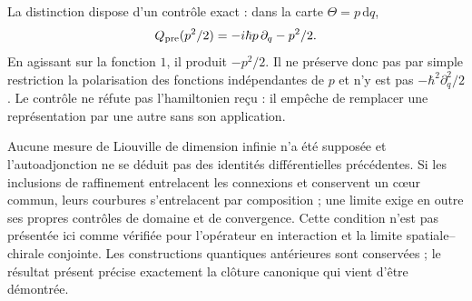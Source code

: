La distinction dispose d’un contrôle exact : dans la carte \(\Theta=p\,\mathrm dq\),
\begin{equation}
 Q_{\rm pre}(p^2/2)=-i\hbar p\,\partial_q-p^2/2.
 \label{hmtcuatro:control-polarizacion}
\end{equation}
En agissant sur la fonction \(1\), il produit \(-p^2/2\). Il ne préserve donc pas par simple restriction la polarisation des fonctions indépendantes de \(p\) et n’y est pas \(-\hbar^2\partial_q^2/2\). Le contrôle ne réfute pas l’hamiltonien reçu : il empêche de remplacer une représentation par une autre sans son application.

Aucune mesure de Liouville de dimension infinie n’a été supposée et l’autoadjonction ne se déduit pas des identités différentielles précédentes. Si les inclusions de raffinement entrelacent les connexions et conservent un cœur commun, leurs courbures s’entrelacent par composition ; une limite exige en outre ses propres contrôles de domaine et de convergence. Cette condition n’est pas présentée ici comme vérifiée pour l’opérateur en interaction et la limite spatiale--chirale conjointe. Les constructions quantiques antérieures sont conservées ; le résultat présent précise exactement la clôture canonique qui vient d’être démontrée.
